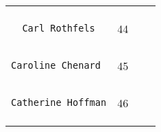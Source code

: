 \documentclass[]{article}
\begin{document}
\begin{longtable}[c]{@{}llll@{}}
\begin{minipage}[t]{0.13\columnwidth}
\end{minipage} & \begin{minipage}[t]{0.15\columnwidth}\raggedright
\end{minipage}
\\\noalign{\medskip}
\begin{minipage}[t]{0.39\columnwidth}\raggedright
\begin{verbatim}
  Carl Rothfels
\end{verbatim}
\end{minipage} & \begin{minipage}[t]{0.10\columnwidth}\raggedright
44
\end{minipage} & \begin{minipage}[t]{0.13\columnwidth}\raggedright
\end{minipage} & \begin{minipage}[t]{0.15\columnwidth}\raggedright
\end{minipage}
\\\noalign{\medskip}
\begin{minipage}[t]{0.39\columnwidth}\raggedright
\begin{verbatim}
Caroline Chenard
\end{verbatim}
\end{minipage} & \begin{minipage}[t]{0.10\columnwidth}\raggedright
45
\end{minipage} & \begin{minipage}[t]{0.13\columnwidth}\raggedright
\end{minipage} & \begin{minipage}[t]{0.15\columnwidth}\raggedright
\end{minipage}
\\\noalign{\medskip}
\begin{minipage}[t]{0.39\columnwidth}\raggedright
\begin{verbatim}
Catherine Hoffman
\end{verbatim}
\end{minipage} & \begin{minipage}[t]{0.10\columnwidth}\raggedright
46
\end{minipage} & \begin{minipage}[t]{0.13\columnwidth}\raggedright
\end{minipage} & \begin{minipage}[t]{0.15\columnwidth}\raggedright
\end{minipage}
\\\noalign{\medskip}

\end{longtable}
\end{document}
